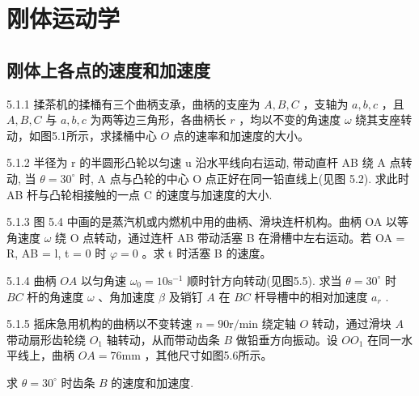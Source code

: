 \chapter{刚体运动学}

\section{刚体上各点的速度和加速度}

\begin{problem}{5.1.1}
揉茶机的揉桶有三个曲柄支承，曲柄的支座为 $A, B, C$ ，支轴为 $a, b, c$ ，且 $A, B, C$ 与 $a, b, c$ 为两等边三角形，各曲柄长 $r$ ，均以不变的角速度 $\omega$ 绕其支座转动，如图5.1所示，求揉桶中心 $O$ 点的速率和加速度的大小。
\begin{center}

\end{center}
\end{problem}
\clearpage


\begin{problem}{5.1.2}
半径为 r 的半圆形凸轮以匀速 u 沿水平线向右运动, 带动直杆 AB 绕 A 点转动, 当 $\theta = 30^{\circ}$ 时, A 点与凸轮的中心 O 点正好在同一铅直线上(见图 5.2). 求此时 AB 杆与凸轮相接触的一点 C 的速度与加速度的大小.
\begin{center}

\end{center}
\end{problem}
\clearpage


\begin{problem}{5.1.3}
图 5.4 中画的是蒸汽机或内燃机中用的曲柄、滑块连杆机构。曲柄 OA 以等角速度 $\omega$ 绕 O 点转动，通过连杆 AB 带动活塞 B 在滑槽中左右运动。若 OA = R, AB = l, t = 0 时 $\varphi = 0$ 。求 t 时活塞 B 的速度。
\begin{center}

\end{center}
\end{problem}
\clearpage


\begin{problem}{5.1.4}
曲柄 $OA$ 以匀角速 $\omega_0 = 10\mathrm{s}^{-1}$ 顺时针方向转动(见图5.5). 求当 $\theta = 30^{\circ}$ 时 $BC$ 杆的角速度 $\omega$ 、角加速度 $\beta$ 及销钉 $A$ 在 $BC$ 杆导槽中的相对加速度 $a_r$ .
\begin{center}

\end{center}
\end{problem}
\clearpage


\begin{problem}{5.1.5}
摇床急用机构的曲柄以不变转速 $n = 90\mathrm{r / min}$ 绕定轴 $O$ 转动，通过滑块 $A$ 带动扇形齿轮绕 $O_{1}$ 轴转动，从而带动齿条 $B$ 做铅垂方向振动。设 $OO_{1}$ 在同一水平线上，曲柄 $OA = 76\mathrm{mm}$ ，其他尺寸如图5.6所示。

求 $\theta = 30^{\circ}$ 时齿条 $B$ 的速度和加速度.
\begin{center}

\end{center}
\end{problem}
\clearpage


